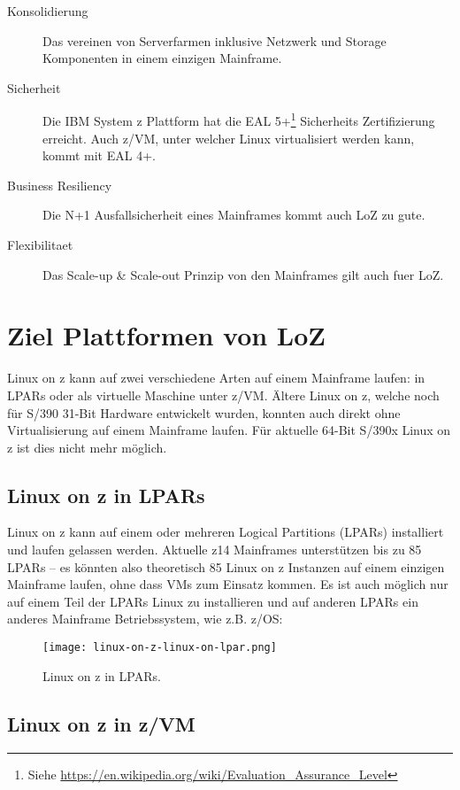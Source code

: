 \begin{description}
    \item[Konsolidierung]{Das vereinen von Serverfarmen inklusive Netzwerk und Storage Komponenten in einem einzigen Mainframe.}
    \item[Sicherheit]{Die IBM System z Plattform hat die EAL 5+\footnote{Siehe \url{https://en.wikipedia.org/wiki/Evaluation_Assurance_Level}} Sicherheits Zertifizierung erreicht. Auch z/VM, unter welcher Linux virtualisiert werden kann, kommt mit EAL 4+.}
    \item[Business Resiliency]{Die N+1 Ausfallsicherheit eines Mainframes kommt auch LoZ zu gute.}
    \item[Flexibilitaet]{Das Scale-up \& Scale-out Prinzip von den Mainframes gilt auch fuer LoZ.}
\end{description}

\section{Ziel Plattformen von LoZ}

Linux on z kann auf zwei verschiedene Arten auf einem Mainframe laufen: in LPARs oder als virtuelle Maschine unter z/VM. Ältere Linux on z, welche noch für S/390 31-Bit Hardware entwickelt wurden, konnten auch direkt ohne Virtualisierung auf einem Mainframe laufen.
Für aktuelle 64-Bit S/390x Linux on z ist dies nicht mehr möglich.

\subsection{Linux on z in LPARs}

Linux on z kann auf einem oder mehreren Logical Partitions (LPARs) installiert und laufen gelassen werden. Aktuelle z14 Mainframes unterstützen bis zu 85 LPARs -- es könnten also theoretisch 85 Linux on z Instanzen auf einem einzigen Mainframe laufen, ohne dass VMs zum Einsatz kommen.
Es ist auch möglich nur auf einem Teil der LPARs Linux zu installieren und auf anderen LPARs ein anderes Mainframe Betriebssystem, wie z.B. z/OS:

\begin{figure}[h!]
\centering
\texttt{[image: linux-on-z-linux-on-lpar.png]}
\caption{Linux on z in LPARs\cite{LinuxOnZOnLPAR}.}
\label{fig:LinuxOnZOnLPAR}
\end{figure}

\subsection{Linux on z in z/VM}

